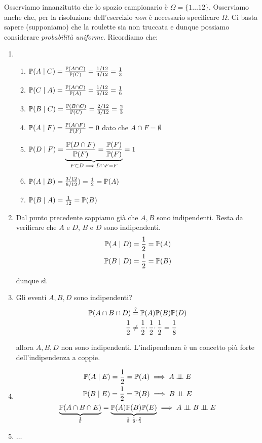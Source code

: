 Osserviamo innanzitutto che lo spazio campionario è $\Omega =\{1\dots 12\}$. Osserviamo anche che, per la risoluzione dell'esercizio \textit{non} è necessario specificare $\Omega $. Ci basta sapere (supponiamo) che la roulette sia non truccata e dunque possiamo considerare \textit{probabilità uniforme}. Ricordiamo che:
\begin{enumerate}
\item 
\begin{enumerate}
\item $\mathbb{P}( A\mid C) =\frac{\mathbb{P}( A\cap C)}{\mathbb{P}( C)} =\frac{1/12}{3/12} =\frac{1}{3}$
\item $\mathbb{P}( C\mid A) =\frac{\mathbb{P}( A\cap C)}{\mathbb{P}( A)} =\frac{1/12}{6/12} =\frac{1}{6}$
\item $\mathbb{P}( B\mid C) =\frac{\mathbb{P}( B\cap C)}{\mathbb{P}( C)} =\frac{2/12}{3/12} =\frac{2}{3}$
\item $\mathbb{P}( A\mid F) =\frac{\mathbb{P}( A\cap F)}{\mathbb{P}( F)} =0$ dato che $A\cap F=\emptyset $
\item $\mathbb{P}( D\mid F) =\underbrace{\frac{\mathbb{P}( D\cap F)}{\mathbb{P}( F)} =\frac{\mathbb{P}( F)}{\mathbb{P}( F)}}_{F\subset D\implies D\cap F=F} =1$
\item $\mathbb{P}( A\mid B) =\frac{3/12}{6/12}) =\frac{1}{2} =\mathbb{P}( A)$
\item $\mathbb{P}( B\mid A) =\frac{1}{12} =\mathbb{P}( B)$
\end{enumerate}
\item Dal punto precedente sappiamo già che $A,B$ sono indipendenti. Resta da verificare che $A$ e $D$, $B$ e $D$ sono indipendenti.\begin{gather*}
\mathbb{P}( A\mid D) =\frac{1}{2} =\mathbb{P}( A)\\
\mathbb{P}( B\mid D) =\frac{1}{2} =\mathbb{P}( B)
\end{gather*}

dunque sì.
\item Gli eventi $A,B,D$ sono indipendenti?\begin{align*}
\mathbb{P}( A\cap B\cap D) & \overset{?}{=} \mathbb{P}( A)\mathbb{P}( B)\mathbb{P}( D)\\
\frac{1}{2} & \neq \frac{1}{2} \cdotp \frac{1}{2} \cdotp \frac{1}{2} =\frac{1}{8}
\end{align*}

allora $A,B,D$ non sono indipendenti. L'indipendenza è un concetto più forte dell'indipendenza a coppie.
\item \begin{gather*}
\PP( A\mid E) =\frac{1}{2} =\PP( A) \implies A\Bot E\\
\PP( B\mid E) =\frac{1}{2} =\PP( B) \implies B\Bot E\\
\underbrace{\PP( A\cap B\cap E)}_{\frac{1}{6}} =\underbrace{\PP( A)\PP( B)\PP( E)}_{\frac{1}{2} \cdotp \frac{1}{2} \cdotp \frac{2}{3}} \implies A\Bot B\Bot E
\end{gather*}
\item $\dots $
\end{enumerate}
\Soluzione

